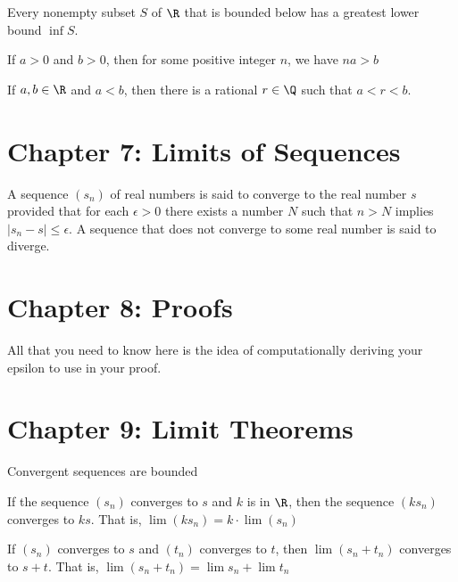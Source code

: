 \documentclass[twoside, 10pt]{article}
\begin{document}
\begin{cor}
Every nonempty subset $S$ of $\R$ that is bounded below has a greatest lower bound $\inf S$.
\end{cor}

\begin{thm} 
If $a > 0$ and $b > 0$, then for some positive integer $n$, we have $na > b$
\end{thm}

\begin{thm} [Density of $\Q$]
If $a,b \in \R$ and $a < b$, then there is a rational $r\in\Q$ such that $a < r < b$.
\end{thm}

\section*{Chapter 7: Limits of Sequences}
\begin{defn}[Convergence]
A sequence $(s_n)$ of real numbers is said to converge to the real number $s$ provided that for each $\epsilon > 0$ there exists a number $N$ such that $n > N$ implies $|s_n - s| \leq \epsilon$. A sequence that does not converge to some real number is said to diverge.
\end{defn}

\section*{Chapter 8: Proofs}
All that you need to know here is the idea of computationally deriving your epsilon to use in your proof.

\section*{Chapter 9: Limit Theorems}
\begin{thm}
Convergent sequences are bounded
\end{thm}

\begin{thm}
If the sequence $(s_n)$ converges to $s$ and $k$ is in $\R$, then the sequence $(ks_n)$ converges to $ks$. That is, $\lim(ks_n) = k\cdot\lim(s_n)$
\end{thm}

\begin{thm}
If $(s_n)$ converges to $s$ and $(t_n)$ converges to $t$, then $\lim(s_n + t_n)$ converges to $s + t$. That is, $\lim(s_n + t_n) = \lim s_n + \lim t_n$
\end{thm}
\end{document}
